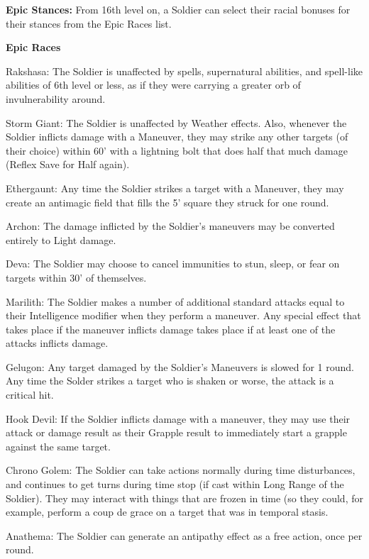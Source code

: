 \textbf{Epic Stances:} From 16th level on, a Soldier can select their racial bonuses for their stances from the Epic Races list.

\textbf{Epic Races}
\begin{description*}
\item[Rakshasa:] The Soldier is unaffected by spells, supernatural abilities, and spell-like abilities of 6th level or less, as if they were carrying a greater orb of invulnerability around.
\item[Storm Giant:] The Soldier is unaffected by Weather effects. Also, whenever the Soldier inflicts damage with a Maneuver, they may strike any other targets (of their choice) within 60' with a lightning bolt that does half that much damage (Reflex Save for Half again).
\item[Ethergaunt:] Any time the Soldier strikes a target with a Maneuver, they may create an antimagic field that fills the 5' square they struck for one round.
\item[Archon:] The damage inflicted by the Soldier's maneuvers may be converted entirely to Light damage.
\item[Deva:] The Soldier may choose to cancel immunities to stun, sleep, or fear on targets within 30' of themselves.
\item[Marilith:] The Soldier makes a number of additional standard attacks equal to their Intelligence modifier when they perform a maneuver. Any special effect that takes place if the maneuver inflicts damage takes place if at least one of the attacks inflicts damage.
\item[Gelugon:] Any target damaged by the Soldier's Maneuvers is slowed for 1 round. Any time the Solder strikes a target who is shaken or worse, the attack is a critical hit.
\item[Hook Devil:] If the Soldier inflicts damage with a maneuver, they may use their attack or damage result as their Grapple result to immediately start a grapple against the same target.
\item[Chrono Golem:] The Soldier can take actions normally during time disturbances, and continues to get turns during time stop (if cast within Long Range of the Soldier). They may interact with things that are frozen in time (so they could, for example, perform a coup de grace on a target that was in temporal stasis.
\item[Anathema:] The Soldier can generate an antipathy effect as a free action, once per round.
\end{description*}

